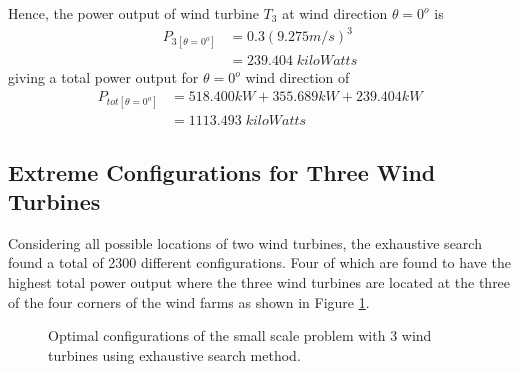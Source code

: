 Hence, the power output of wind turbine $T_3$ at wind direction $\theta=0^o$ is
    \begin{align*}
        P_{3[\theta=0^o]} &= 0.3(9.275m/s)^3 \\
        &= 239.404\;kiloWatts
    \end{align*}
giving a total power output for $\theta=0^o$ wind direction of
	\begin{align*}
		P_{tot[\theta=0^o]} &= 518.400kW + 355.689kW + 239.404kW \\
		&=1113.493\;kiloWatts
	\end{align*}
	
	\subsection{Extreme Configurations for Three Wind Turbines}
	Considering all possible locations of two wind turbines, the exhaustive search found a total of 2300 different configurations. Four of which are found to have the highest total power output where the three wind turbines are located at the three of the four corners of the wind farms as shown in Figure \ref{small3}.
	
	\begin{figure}[H]
            \centering
            \qquad
            \qquad
            \qquad
            \caption{Optimal configurations of the small scale problem with 3 wind turbines using exhaustive search method.}
            \label{small3}
        \end{figure}
	
